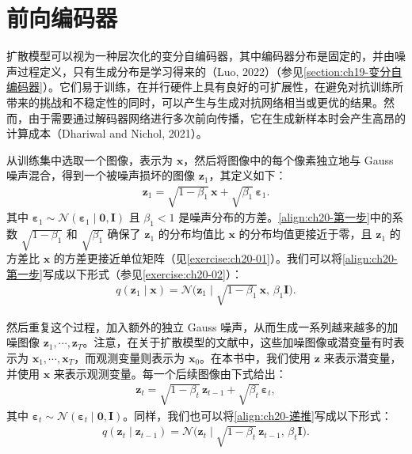 \documentclass[../../main.tex]{subfiles}
\begin{document}
\section{前向编码器}\label{section:ch20-前向编码器}

扩散模型可以视为一种层次化的变分自编码器，其中编码器分布是固定的，并由噪声过程定义，只有生成分布是学习得来的（Luo, 2022）（参见\cref{section:ch19-变分自编码器}）。它们易于训练，在并行硬件上具有良好的可扩展性，在避免对抗训练所带来的挑战和不稳定性的同时，可以产生与生成对抗网络相当或更优的结果。然而，由于需要通过解码器网络进行多次前向传播，它在生成新样本时会产生高昂的计算成本（Dhariwal and Nichol, 2021）。

从训练集中选取一个图像，表示为 $\bm{x}$，然后将图像中的每个像素独立地与 Gauss 噪声混合，得到一个被噪声损坏的图像 $\bm{z}_1$，其定义如下：
\begin{align}
\bm{z}_1=\sqrt{1-\beta_1}\,\bm{x}+\sqrt{\beta_1}\,\bm{\varepsilon}_1.
\label{align:ch20-第一步}
\end{align}
其中 $\bm{\varepsilon}_1\sim\mathcal{N}(\bm{\varepsilon}_1\mid\bm{0},\bm{I})$ 且 $\beta_1<1$ 是噪声分布的方差。\eqref{align:ch20-第一步}中的系数 $\sqrt{1-\beta_1}$ 和 $\sqrt{\beta_1}$ 确保了 $\bm{z}_1$ 的分布均值比 $\bm{x}$ 的分布均值更接近于零，且 $\bm{z}_1$ 的方差比 $\bm{x}$ 的方差更接近单位矩阵（见\cref{exercise:ch20-01}）。我们可以将\eqref{align:ch20-第一步}写成以下形式（参见\cref{exercise:ch20-02}）：
\begin{align}
q(\bm{z}_1\mid\bm{x})=\mathcal{N}\big(\bm{z}_1\mid\sqrt{1-\beta_1}\,\bm{x},\,\beta_1\bm{I}\big).
\label{align:ch20-一步分布}
\end{align}

然后重复这个过程，加入额外的独立 Gauss 噪声，从而生成一系列越来越多的加噪图像 $\bm{z}_1,\cdots,\bm{z}_T$。注意，在关于扩散模型的文献中，这些加噪图像或潜变量有时表示为 $\bm{x}_1,\cdots,\bm{x}_T$，而观测变量则表示为 $\bm{x}_0$。在本书中，我们使用 $\bm{z}$ 来表示潜变量，并使用 $\bm{x}$ 来表示观测变量。每一个后续图像由下式给出：
\begin{align}
\bm{z}_t=\sqrt{1-\beta_t}\,\bm{z}_{t-1}+\sqrt{\beta_t}\,\bm{\varepsilon}_t,
\label{align:ch20-递推}
\end{align}
其中 $\bm{\varepsilon}_t\sim\mathcal{N}(\bm{\varepsilon}_t\mid\bm{0},\bm{I})$。同样，我们也可以将\eqref{align:ch20-递推}写成以下形式：
\begin{align}
q(\bm{z}_t\mid\bm{z}_{t-1})=\mathcal{N}\big(\bm{z}_t\mid\sqrt{1-\beta_t}\,\bm{z}_{t-1},\,\beta_t\bm{I}\big).
\label{align:ch20-转移核}
\end{align}
\end{document}
